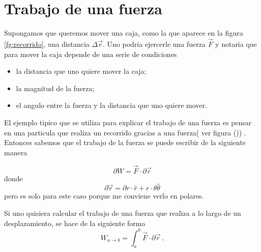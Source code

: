\documentclass[../Main.tex]{subfiles}
\begin{document}
{

    \section{Trabajo de una fuerza}
    Supongamos que queremos mover una caja, como la que aparece en la figura \ref{fg:recorrido},
    una distancia $\Delta \vec{r}$. Uno podria ejercerle una fuerza $\vec{F}$ y notaria 
    que para mover la caja depende de una serie de condiciones

    \begin{itemize}
        \item la distancia que uno quiere mover la caja;
        \item la magnitud de la fuerza;
        \item el angulo entre la fuerza y la distancia que uno quiere mover.
    \end{itemize}

    El ejemplo tipico que se utiliza para explicar el trabajo de una fuerza es 
    pensar en una particula que realiza un recorrido gracias a una fuerza( ver figura ())
    . Entonces sabemos que el trabajo de la fuerza se puede escribir de la siguiente
    manera

    \begin{equation}
        \partial W = \vec{F} \cdot \partial \vec{r}
        \label{eq:dtrabajo}
    \end{equation}
    donde 
    \begin{equation*}
        \partial \vec{r} = \partial r \cdot \hat{r} + r \cdot \theta \hat{\theta}
    \end{equation*}
    pero es solo para este caso porque me conviene verlo en polares.

    Si uno quisiera calcular el trabajo de una fuerza que realiza a lo largo de un
    desplazamiento, se hace de la siguiente forma
    \begin{equation*}
        W_{a \rightarrow b} = \int _a ^ b \vec{F} \cdot \partial \vec{r} \ .
    \end{equation*}

}
\end{document}
